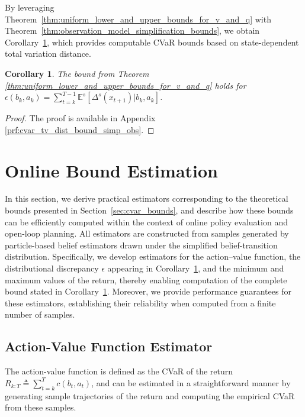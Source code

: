 \documentclass[acmlarge, manuscript, screen, review, natbib=false, oneside]{acmart}
\newtheorem{corollary}[theorem]{Corollary}
\begin{document}
By leveraging Theorem~\ref{thm:uniform_lower_and_upper_bounds_for_v_and_q} with Theorem~\ref{thm:observation_model_simplification_bounds}, we obtain Corollary~\ref{thm:cvar_tv_dist_bound_simp_obs}, which provides computable CVaR bounds based on state-dependent total variation distance.
\begin{corollary}\label{thm:cvar_tv_dist_bound_simp_obs}
	The bound from Theorem \ref{thm:uniform_lower_and_upper_bounds_for_v_and_q} holds for $\epsilon(b_k, a_k)=\sum_{t=k}^{T-1} \mathbb{E}^s[\Delta^s(x_{t+1})|b_k, a_k]$.
\end{corollary}
\begin{proof}
	The proof is available in Appendix \ref{prf:cvar_tv_dist_bound_simp_obs}.
\end{proof}

\section{Online Bound Estimation}\label{sec:online_bound_estimation}
In this section, we derive practical estimators corresponding to the theoretical bounds presented in Section~\ref{sec:cvar_bounds}, and describe how these bounds can be efficiently computed within the context of online policy evaluation and open-loop planning. All estimators are constructed from samples generated by particle-based belief estimators drawn under the simplified belief-transition distribution. Specifically, we develop estimators for the action–value function, the distributional discrepancy $\epsilon$ appearing in Corollary~\ref{thm:cvar_tv_dist_bound_simp_obs}, and the minimum and maximum values of the return, thereby enabling computation of the complete bound stated in Corollary~\ref{thm:cvar_tv_dist_bound_simp_obs}. Moreover, we provide performance guarantees for these estimators, establishing their reliability when computed from a finite number of samples.

\subsection{Action-Value Function Estimator}\label{sec:q_func_estimator}
The action-value function is defined as the CVaR of the return $R_{k:T} \triangleq \sum_{t=k}^T c(b_t, a_t)$, and can be estimated in a straightforward manner by generating sample trajectories of the return and computing the empirical CVaR from these samples. 
\end{document}
